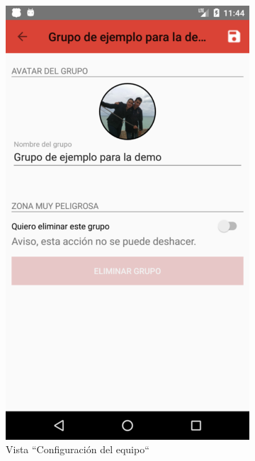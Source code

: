 \documentclass[twoside]{report}
\begin{document}
\begin{figure}[H]
\begin{center}
\begin{subfigure}[t]{.3\linewidth}
		\includegraphics[scale=0.2]{images/userguide/17.png}
		\caption{Vista “Configuración del equipo“}
	\end{subfigure}\hspace{2mm}%
	\begin{subfigure}[t]{.3\linewidth}

\end{subfigure}
\end{center}
\end{figure}
\end{document}

